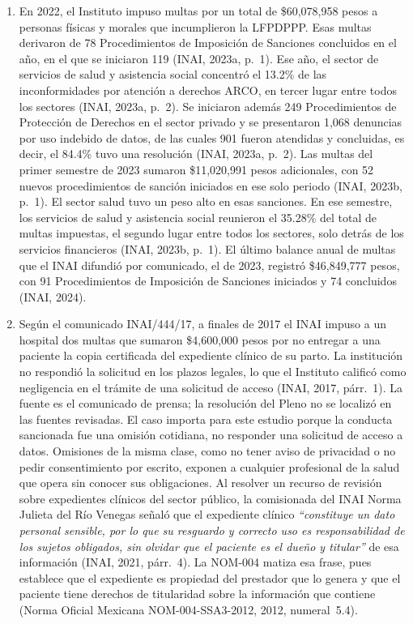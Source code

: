 \documentclass[12pt, a4paper]{article}
\begin{document}
\begin{enumerate}[label=\Roman*.]
  \item En 2022, el Instituto
  impuso multas por un total de \$60,078,958 pesos a personas físicas
  y morales que incumplieron la LFPDPPP. Esas multas derivaron de 78
  Procedimientos de Imposición de Sanciones concluidos en el año, en
  el que se iniciaron 119 (INAI, 2023a,
  p.~1). Ese año, el sector de servicios de salud y asistencia
  social concentró el 13.2\% de las inconformidades por atención a
  derechos ARCO, en tercer lugar entre todos los sectores (INAI,
  2023a, p.~2). Se iniciaron además 249 Procedimientos de
  Protección de Derechos en el sector privado y se presentaron
  1,068 denuncias por uso indebido de datos, de las cuales 901 fueron
  atendidas y concluidas, es decir, el 84.4\% tuvo una resolución
  (INAI, 2023a, p.~2). Las multas del primer semestre de 2023
  sumaron \$11,020,991 pesos adicionales, con 52 nuevos
  procedimientos de sanción iniciados en ese solo periodo (INAI,
  2023b, p.~1). El sector salud tuvo un peso alto en esas sanciones.
  En ese semestre, los servicios de salud y asistencia social
  reunieron el 35.28\% del total de multas impuestas, el segundo
  lugar entre todos los sectores, solo detrás de los servicios
  financieros (INAI, 2023b, p.~1). El último balance anual de multas
  que el INAI difundió por comunicado, el de 2023, registró
  \$46,849,777 pesos, con 91 Procedimientos de Imposición de
  Sanciones iniciados y 74 concluidos (INAI, 2024).
 
  \item Según el comunicado INAI/444/17, a finales de 2017 el INAI
  impuso a un hospital dos multas que sumaron \$4,600,000 pesos por
  no entregar a una paciente la copia certificada del expediente
  clínico de su parto. La institución no respondió la solicitud en
  los plazos legales, lo que el Instituto calificó como negligencia
  en el trámite de una solicitud de acceso (INAI, 2017, párr.~1). La
  fuente es el comunicado de prensa; la resolución del Pleno no se
  localizó en las fuentes revisadas. El caso importa para
  este estudio porque la conducta sancionada fue una omisión
  cotidiana, no responder una solicitud de acceso a datos. Omisiones
  de la misma clase, como no tener aviso de privacidad o no pedir
  consentimiento por escrito, exponen a cualquier profesional de la
  salud que opera sin conocer sus obligaciones. Al resolver un
  recurso de revisión sobre expedientes clínicos del sector público,
  la comisionada del INAI Norma Julieta del Río Venegas señaló que
  el expediente clínico \textit{``constituye un dato personal
  sensible, por lo que su resguardo y correcto uso es responsabilidad
  de los sujetos obligados, sin olvidar que el paciente es el dueño y
  titular''} de esa información (INAI, 2021, párr.~4). La NOM-004
  matiza esa frase, pues establece que el expediente es propiedad
  del prestador que lo genera y que el paciente tiene derechos de
  titularidad sobre la información que contiene (Norma Oficial
  Mexicana NOM-004-SSA3-2012, 2012, numeral~5.4).
 

\end{enumerate}
\end{document}
